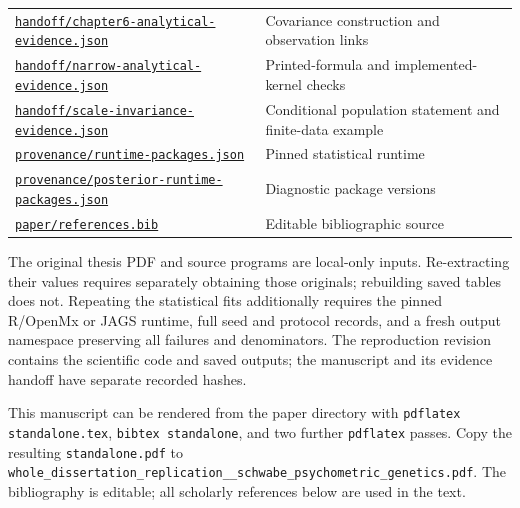 \documentclass[11pt]{article}
\begin{document}
\begin{longtable}{p{225pt}p{220pt}}
\href{https://github.com/alectionary/vibe-math/blob/master/formalization/schwabe-psychometric-genetics/handoff/chapter6-analytical-evidence.json}{\nolinkurl{handoff/chapter6-analytical-evidence.json}} & Covariance construction and observation links\\
\href{https://github.com/alectionary/vibe-math/blob/master/formalization/schwabe-psychometric-genetics/handoff/narrow-analytical-evidence.json}{\nolinkurl{handoff/narrow-analytical-evidence.json}} & Printed-formula and implemented-kernel checks\\
\href{https://github.com/alectionary/vibe-math/blob/master/formalization/schwabe-psychometric-genetics/handoff/scale-invariance-evidence.json}{\nolinkurl{handoff/scale-invariance-evidence.json}} & Conditional population statement and finite-data example\\
\href{https://github.com/alectionary/vibe-math/blob/master/formalization/schwabe-psychometric-genetics/provenance/runtime-packages.json}{\nolinkurl{provenance/runtime-packages.json}} & Pinned statistical runtime\\
\href{https://github.com/alectionary/vibe-math/blob/master/formalization/schwabe-psychometric-genetics/provenance/posterior-runtime-packages.json}{\nolinkurl{provenance/posterior-runtime-packages.json}} & Diagnostic package versions\\
\href{https://github.com/alectionary/vibe-math/blob/master/formalization/schwabe-psychometric-genetics/paper/references.bib}{\nolinkurl{paper/references.bib}} & Editable bibliographic source\\
\bottomrule\end{longtable}
The original thesis PDF and source programs are local-only inputs. Re-extracting their values requires separately obtaining those originals; rebuilding saved tables does not. Repeating the statistical fits additionally requires the pinned R/OpenMx or JAGS runtime, full seed and protocol records, and a fresh output namespace preserving all failures and denominators. The reproduction revision contains the scientific code and saved outputs; the manuscript and its evidence handoff have separate recorded hashes.

This manuscript can be rendered from the paper directory with \texttt{pdflatex standalone.tex}, \texttt{bibtex standalone}, and two further \texttt{pdflatex} passes. Copy the resulting \nolinkurl{standalone.pdf} to \nolinkurl{whole_dissertation_replication__schwabe_psychometric_genetics.pdf}. The bibliography is editable; all scholarly references below are used in the text.


\end{document}
